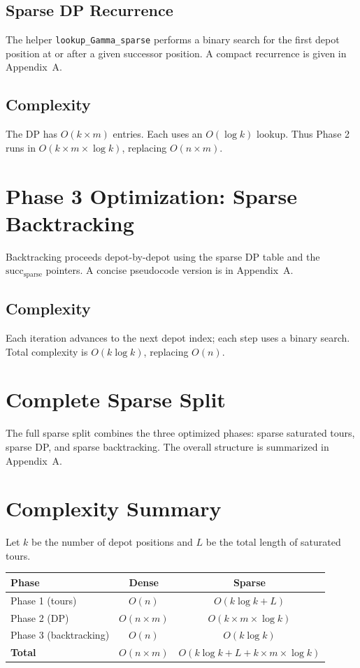 \documentclass[11pt]{article}
\theoremstyle{definition}
\begin{document}
\subsection*{Sparse DP Recurrence}
The helper \texttt{lookup\_Gamma\_sparse} performs a binary search for the first depot position at or after a given successor position. A compact recurrence is given in Appendix~A.

\subsection*{Complexity}
The DP has $O(k \times m)$ entries. Each uses an $O(\log k)$ lookup. Thus Phase 2 runs in $O(k \times m \times \log k)$, replacing $O(n \times m)$.

\section{Phase 3 Optimization: Sparse Backtracking}

Backtracking proceeds depot-by-depot using the sparse DP table and the $\text{succ}_{\text{sparse}}$ pointers. A concise pseudocode version is in Appendix~A.

\subsection*{Complexity}
Each iteration advances to the next depot index; each step uses a binary search. Total complexity is $O(k \log k)$, replacing $O(n)$.

\section{Complete Sparse Split}

The full sparse split combines the three optimized phases: sparse saturated tours, sparse DP, and sparse backtracking. The overall structure is summarized in Appendix~A.

\section{Complexity Summary}

Let $k$ be the number of depot positions and $L$ be the total length of saturated tours.

\begin{center}
\begin{tabular}{lcc}
\toprule
Phase & Dense & Sparse \\
\midrule
Phase 1 (tours) & $O(n)$ & $O(k \log k + L)$ \\
Phase 2 (DP) & $O(n \times m)$ & $O(k \times m \times \log k)$ \\
Phase 3 (backtracking) & $O(n)$ & $O(k \log k)$ \\
\textbf{Total} & $O(n \times m)$ & $O(k \log k + L + k \times m \times \log k)$ \\
\bottomrule
\end{tabular}
\end{center}
\end{document}
